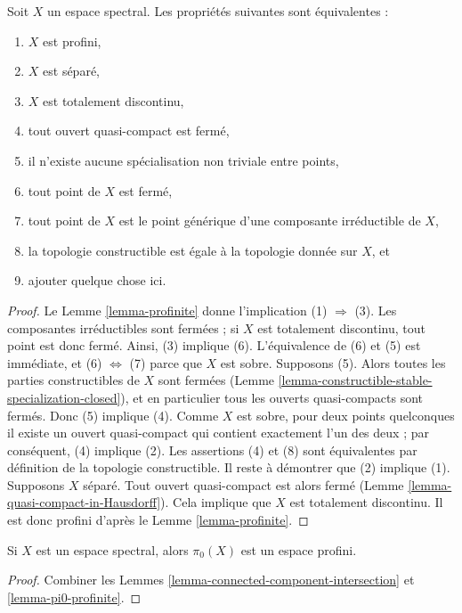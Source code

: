 \begin{lemma}
\label{lemma-characterize-profinite-spectral}
Soit $X$ un espace spectral. Les propriétés suivantes sont équivalentes :
\begin{enumerate}
\item $X$ est profini,
\item $X$ est séparé,
\item $X$ est totalement discontinu,
\item tout ouvert quasi-compact est fermé,
\item il n'existe aucune spécialisation non triviale entre points,
\item tout point de $X$ est fermé,
\item tout point de $X$ est le point générique d'une composante irréductible
de $X$,
\item la topologie constructible est égale à la topologie donnée sur $X$, et
\item ajouter quelque chose ici.
\end{enumerate}
\end{lemma}

\begin{proof}
Le Lemme \ref{lemma-profinite} donne l'implication (1) $\Rightarrow$ (3).
Les composantes irréductibles sont fermées ; si $X$ est totalement discontinu,
tout point est donc fermé. Ainsi, (3) implique (6). L'équivalence de (6) et
(5) est immédiate, et (6) $\Leftrightarrow$ (7) parce que $X$ est sobre.
Supposons (5). Alors toutes les parties constructibles de $X$ sont fermées
(Lemme \ref{lemma-constructible-stable-specialization-closed}), et en
particulier tous les ouverts quasi-compacts sont fermés. Donc (5) implique (4).
Comme $X$ est sobre, pour deux points quelconques il existe un ouvert
quasi-compact qui contient exactement l'un des deux ; par conséquent, (4)
implique (2). Les assertions (4) et (8) sont équivalentes par définition de la
topologie constructible.
Il reste à démontrer que (2) implique (1). Supposons $X$ séparé. Tout ouvert
quasi-compact est alors fermé
(Lemme \ref{lemma-quasi-compact-in-Hausdorff}). Cela implique que $X$ est
totalement discontinu. Il est donc profini d'après le
Lemme \ref{lemma-profinite}.
\end{proof}

\begin{lemma}
\label{lemma-spectral-pi0}
Si $X$ est un espace spectral, alors $\pi_0(X)$ est un espace profini.
\end{lemma}

\begin{proof}
Combiner les Lemmes \ref{lemma-connected-component-intersection} et
\ref{lemma-pi0-profinite}.
\end{proof}

